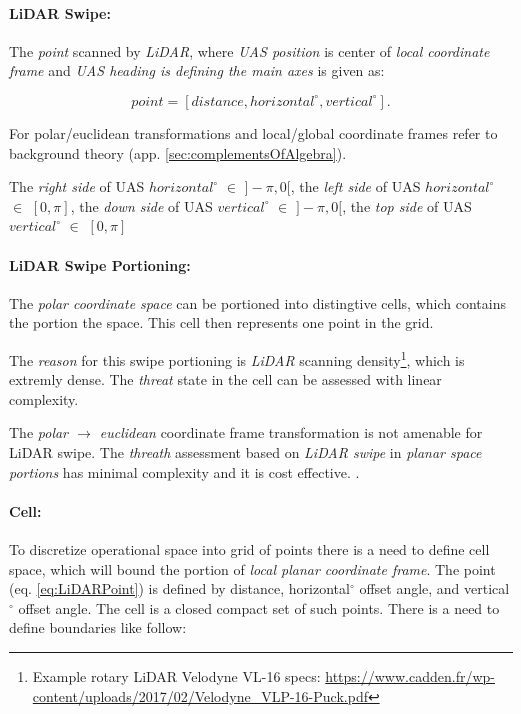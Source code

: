 \paragraph{LiDAR Swipe:} The \emph{point} scanned by \emph{LiDAR}, where \emph{UAS position} is center of \emph{local coordinate frame} and \emph{UAS heading is defining the main axes} is given as:

\begin{equation}\label{eq:LiDARPoint}
    point = [distance,horizontal^\circ,vertical^\circ].
\end{equation}

\begin{note}
    For polar/euclidean transformations and local/global coordinate frames refer to background theory (app. \ref{sec:complementsOfAlgebra}). 
    
    The \emph{right side} of UAS $horizontal^\circ$ $\in$ $]-\pi,0[$, the \emph{left side} of UAS $horizontal^\circ$ $\in$ $[0,\pi]$, the \emph{down side} of UAS $vertical^\circ$ $\in$ $]-\pi,0[$, the \emph{top side} of UAS $vertical^\circ$ $\in$ $[0,\pi]$
\end{note}

\paragraph{LiDAR Swipe Portioning:} The \emph{polar coordinate space} can be portioned into distingtive cells, which contains the portion the space. This cell then represents one point in the grid.

The \emph{reason} for this swipe portioning is \emph{LiDAR} scanning density\footnote{Example rotary LiDAR Velodyne VL-16 specs: \url{https://www.cadden.fr/wp-content/uploads/2017/02/Velodyne_VLP-16-Puck.pdf}}, which is extremly dense. The \emph{threat} state in the cell can be assessed with linear complexity. 

The \emph{polar $\to$ euclidean} coordinate frame transformation is not amenable  for LiDAR swipe. The \emph{threath} assessment based on \emph{LiDAR swipe} in \emph{planar space portions}
has minimal complexity and it is cost effective. \cite{gupta2010comparative}.


\paragraph{Cell:} To discretize operational space into grid of points there is a need to define cell space, which will bound the portion of \emph{local planar coordinate frame}. The point (eq. \ref{eq:LiDARPoint}) is defined by distance, horizontal$^\circ$ offset angle, and vertical$^\circ$ offset angle. The cell is a closed compact set of such points. There is a need to define boundaries like follow: 


